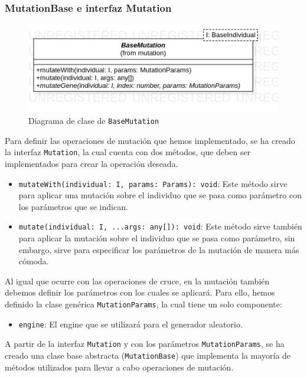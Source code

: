 \subsubsection{MutationBase e interfaz Mutation}

\begin{figure}[ht]
    \centering
    \includegraphics[scale=0.4]{mem/images/cap-4/4.2.7(Mutation)/BaseMutation.png}
    \caption{Diagrama de clase de \texttt{BaseMutation}}
    \label{fig:my_label}
\end{figure}

Para definir las operaciones de mutación que hemos implementado, se ha creado la interfaz \texttt{Mutation}, la cual cuenta con dos métodos, que deben ser implementados para crear la operación deseada.

\begin{itemize}
    \item \texttt{mutateWith(individual: I, params: Params): void}: Este método sirve para aplicar una mutación sobre el individuo que se pasa como parámetro con los parámetros que se indican.
    \item \texttt{mutate(individual: I, ...args: any[]): void}: Este método sirve también para aplicar la mutación sobre el individuo que se pasa como parámetro, sin embargo, sirve para especificar los parámetros de la mutación de manera más cómoda.
\end{itemize}

Al igual que ocurre con las operaciones de cruce, en la mutación también debemos definir los parámetros con los cuales se aplicará. Para ello, hemos definido la clase genérica \texttt{MutationParams}, la cual tiene un solo componente:

\begin{itemize}
    \item \texttt{engine}: El engine que se utilizará para el generador aleatorio.
\end{itemize}

A partir de la interfaz \texttt{Mutation} y con los parámetros \texttt{MutationParams}, se ha creado una clase base abstracta (\texttt{MutationBase}) que implementa la mayoría de métodos utilizados para llevar a cabo operaciones de mutación.\\

